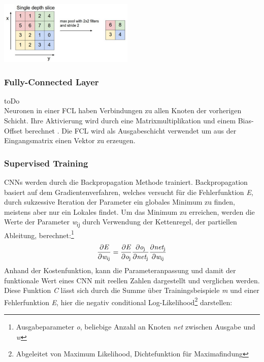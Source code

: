 \documentclass[twosided,a4,10pt]{article}
\begin{document}
\begin{multicols}{2}
		\begin{minipage}{0.4\textwidth}
			\centering
			\includegraphics{img/pooling.png}
			\label{img:pooling}
		\end{minipage}\newline
		
		\subsubsection*{Fully-Connected Layer} toDo\\
		Neuronen in einer FCL haben Verbindungen zu allen Knoten der vorherigen Schicht. Ihre Aktivierung wird durch eine Matrixmultiplikation und einem Bias-Offset berechnet \cite{karpathy}. Die FCL wird als Ausgabeschicht verwendet um aus der Eingangsmatrix einen Vektor zu erzeugen.
		
		\subsubsection{Supervised Training}
		CNNs werden durch die Backpropagation Methode trainiert. Backpropagation basiert auf dem Gradientenverfahren, welches versucht für die Fehlerfunktion \textit{E}, durch sukzessive Iteration der Parameter ein globales Minimum zu finden, meistens aber nur ein Lokales findet. Um das Minimum zu erreichen, werden die Werte der Parameter \textit{w}\textsubscript{ij} durch Verwendung der Kettenregel, der partiellen Ableitung, berechnet:\footnote[12]{Ausgabeparameter \textit{o}, beliebige Anzahl an Knoten \textit{net} zwischen Ausgabe und \textit{w}}
		\begin{equation*}
		\centering
		\frac{\partial\textit{E}}{\partial\textit{w}\textsubscript{ij}} = \frac{\partial\textit{E}}{\partial\textit{o}\textsubscript{j}} \frac{\partial\textit{o}\textsubscript{j}}{\partial\textit{net}\textsubscript{j}}  \frac{\partial\textit{net}\textsubscript{j}}{\partial\textit{w}\textsubscript{ij}} 
		\end{equation*}
		Anhand der Kostenfunktion, kann die Parameteranpassung und damit der funktionale Wert eines CNN mit reellen Zahlen dargestellt und verglichen werden. Diese Funktion \textit{C} lässt sich durch die Summe über Trainingsbeispiele \textit{m} und einer Fehlerfunktion \textit{E}, hier die negativ conditional Log-Likelihood\footnote[13]{Abgeleitet von Maximum Likelihood, Dichtefunktion für Maximafindung} darstellen: 
		

\end{multicols}
\end{document}
